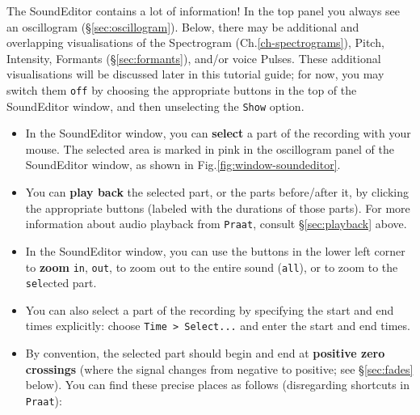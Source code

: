 \documentclass[
]{book}
\begin{document}
The SoundEditor contains a lot of information! In the top panel you always see an oscillogram (§\ref{sec:oscillogram}). Below, there may be additional and overlapping visualisations of the Spectrogram (Ch.\ref{ch-spectrograms}), Pitch, Intensity, Formants (§\ref{sec:formants}), and/or voice Pulses. These additional visualisations will be discussed later in this tutorial guide; for now, you may switch them \texttt{off} by choosing the appropriate buttons in the top of the SoundEditor window, and then unselecting the \texttt{Show} option.

\begin{itemize}
\item
  In the SoundEditor window, you can \textbf{select} a part of the recording with your mouse. The selected area is marked in pink in the oscillogram panel of the SoundEditor window, as shown in Fig.\ref{fig:window-soundeditor}.
\item
  You can \textbf{play back} the selected part, or the parts before/after it, by clicking the appropriate buttons (labeled with the durations of those parts). For more information about audio playback from \texttt{Praat}, consult §\ref{sec:playback} above.
\item
  In the SoundEditor window, you can use the buttons in the lower left corner to \textbf{zoom} \texttt{in}, \texttt{out}, to zoom out to the entire sound (\texttt{all}), or to zoom to the \texttt{sel}ected part.
\item
  You can also select a part of the recording by specifying the start and end times explicitly: choose \texttt{Time\ \textgreater{}\ Select...} and enter the start and end times.
\item
  By convention, the selected part should begin and end at \textbf{positive zero crossings} (where the signal changes from negative to positive; see §\ref{sec:fades} below). You can find these precise places as follows (disregarding shortcuts in \texttt{Praat}):


\end{itemize}
\end{document}
